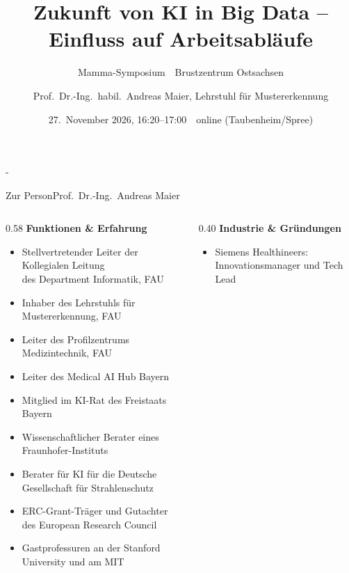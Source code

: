 \documentclass[final]{beamer}
\title[KI in Big Data]{Zukunft von KI in Big Data -- Einfluss auf Arbeitsabläufe}
\subtitle{Mamma-Symposium \,\textbullet\, Brustzentrum Ostsachsen}
\author[A.~Maier]{Prof.\ Dr.-Ing.\ habil.\ Andreas Maier, Lehrstuhl für Mustererkennung}
\institute[FAU]{Friedrich-Alexander-Universität Erlangen-Nürnberg}
\date{27.~November 2026, 16:20--17:00 \,\textbullet\, online (Taubenheim/Spree)}
\begin{document}

\begin{frame}[t,titleimage]{-}
\titlepage%
\end{frame}

\begin{frame}[t]{Zur Person}{Prof.\ Dr.-Ing.\ Andreas Maier}
\vspace{0.6em}
\begin{columns}[T]
  \begin{column}{0.58\textwidth}
    {\Large\bfseries\color{FAUBlue} Funktionen \& Erfahrung}
    \vspace{0.3em}
    \begin{itemize}\itemsep=0.6em
      \item Stellvertretender Leiter der Kollegialen Leitung\\
            des Department Informatik, FAU
      \item Inhaber des Lehrstuhls für Mustererkennung, FAU
      \item Leiter des Profilzentrums Medizintechnik, FAU
      \item Leiter des Medical AI Hub Bayern
      \item Mitglied im KI-Rat des Freistaats Bayern
      \item Wissenschaftlicher Berater eines Fraunhofer-Instituts
      \item Berater für KI für die Deutsche Gesellschaft für Strahlenschutz
      \item ERC-Grant-Träger und Gutachter des European Research Council
      \item Gastprofessuren an der Stanford University und am MIT
    \end{itemize}
  \end{column}
  \begin{column}{0.40\textwidth}
    {\Large\bfseries\color{FAUBlue} Industrie \& Gründungen}
    \vspace{0.3em}
    \begin{itemize}\itemsep=0.6em
      \item Siemens Healthineers: Innovationsmanager und Tech Lead

\end{itemize}
\end{column}
\end{columns}
\end{frame}
\end{document}
